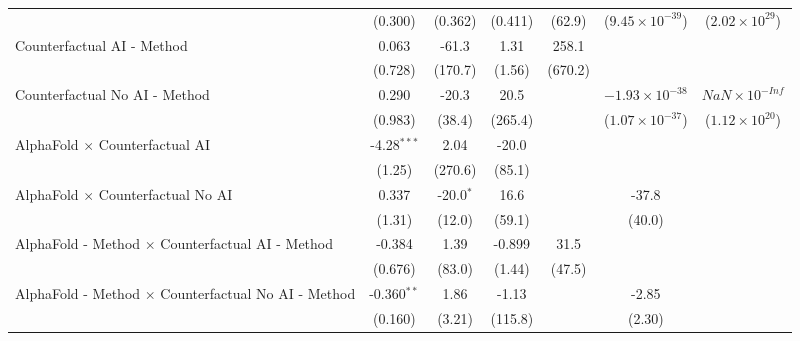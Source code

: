 \begin{tabular}{lcccccc}
                                                              & (0.300)       & (0.362)     & (0.411)     & (62.9)        & ($9.45\times 10^{-39}$)  & ($2.02\times 10^{29}$)\\    
   Counterfactual AI - Method                                 & 0.063         & -61.3       & 1.31        & 258.1         &                          &   \\   
                                                              & (0.728)       & (170.7)     & (1.56)      & (670.2)       &                          &   \\   
   Counterfactual No AI - Method                              & 0.290         & -20.3       & 20.5        &               & $-1.93\times 10^{-38}$   & $NaN\times 10^{-Inf}$\\    
                                                              & (0.983)       & (38.4)      & (265.4)     &               & ($1.07\times 10^{-37}$)  & ($1.12\times 10^{20}$)\\    
   AlphaFold $\times$ Counterfactual AI                       & -4.28$^{***}$ & 2.04        & -20.0       &               &                          &   \\   
                                                              & (1.25)        & (270.6)     & (85.1)      &               &                          &   \\   
   AlphaFold $\times$ Counterfactual No AI                    & 0.337         & -20.0$^{*}$ & 16.6        &               & -37.8                    &   \\   
                                                              & (1.31)        & (12.0)      & (59.1)      &               & (40.0)                   &   \\   
   AlphaFold - Method $\times$ Counterfactual AI - Method     & -0.384        & 1.39        & -0.899      & 31.5          &                          &   \\   
                                                              & (0.676)       & (83.0)      & (1.44)      & (47.5)        &                          &   \\   
   AlphaFold - Method $\times$ Counterfactual No AI - Method  & -0.360$^{**}$ & 1.86        & -1.13       &               & -2.85                    &   \\   
                                                              & (0.160)       & (3.21)      & (115.8)     &               & (2.30)                   &   \\   

\end{tabular}
